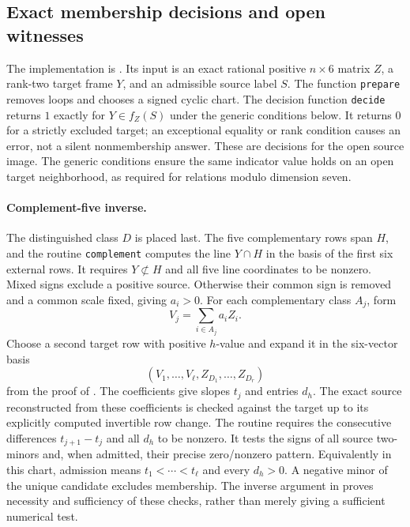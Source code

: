 \documentclass[11pt]{article}
\newcommand{\1}{\mathbf 1}
\begin{document}
\subsection{Exact membership decisions and open witnesses}
\label{app:inverse}

The implementation is .  Its input is an
exact rational positive $n\times6$ matrix $Z$, a rank-two target frame
$Y$, and an admissible source label $S$.  The function \texttt{prepare}
removes loops and chooses a signed cyclic chart.  The decision function
\texttt{decide} returns $1$ exactly for $Y\in f_Z(S)$ under the generic
conditions below.  It returns $0$ for a strictly excluded target; an
exceptional equality or rank condition causes an error, not a silent
nonmembership answer.  These are decisions for the open source image.
The generic conditions ensure the same indicator value holds on an open
target neighborhood, as required for relations modulo dimension seven.

\paragraph{Complement-five inverse.}
The distinguished class $D$ is placed last.  The five complementary rows
span $H$, and the routine \texttt{complement} computes the line $Y\cap H$
in the basis of the first six external rows.  It requires $Y\not\subset H$
and all five line coordinates to be nonzero.  Mixed signs exclude a
positive source.  Otherwise their common sign is removed and a common
scale fixed, giving $a_i>0$.  For each complementary class $A_j$, form
\[
V_j=\sum_{i\in A_j}a_iZ_i.
\]
Choose a second target row with positive $h$-value and expand it in the
six-vector basis
\[
(V_1,\dots,V_\ell,Z_{D_1},\dots,Z_{D_r})
\]
from the proof of
.  The coefficients give slopes $t_j$ and entries
$d_h$.  The exact source reconstructed from these coefficients is checked
against the target up to its explicitly computed invertible row change.
The routine requires the consecutive differences $t_{j+1}-t_j$ and all
$d_h$ to be nonzero.  It tests the signs of all source two-minors and,
when admitted, their precise zero/nonzero pattern.  Equivalently in this
chart, admission means $t_1<\cdots<t_\ell$ and every $d_h>0$.
A negative minor of the unique candidate excludes membership.  The inverse
argument in  proves necessity and sufficiency of
these checks, rather than merely giving a sufficient numerical test.
\end{document}
